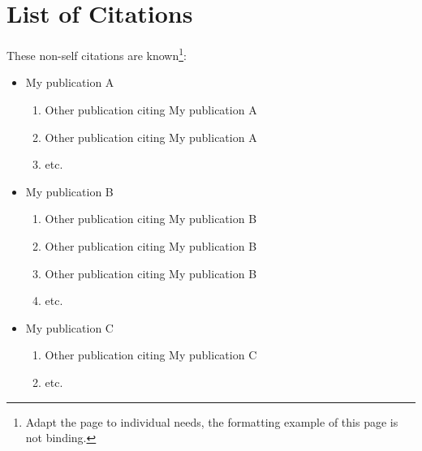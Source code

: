 \chapter*{List of Citations}
\label{sec:ListOfCitations}
These non-self citations are known\footnote{Adapt the page to individual needs, the formatting example of this page is not binding.}:
\begin{itemize}
	\item My publication A
		\begin{enumerate}
			\item Other publication citing My publication A
			\item Other publication citing My publication A
			\item etc.
		\end{enumerate}
	\item My publication B
		\begin{enumerate}
			\item Other publication citing My publication B
			\item Other publication citing My publication B
			\item Other publication citing My publication B
			\item etc.
		\end{enumerate}
	\item My publication C
		\begin{enumerate}
			\item Other publication citing My publication C
			\item etc.
		\end{enumerate}
\end{itemize}



